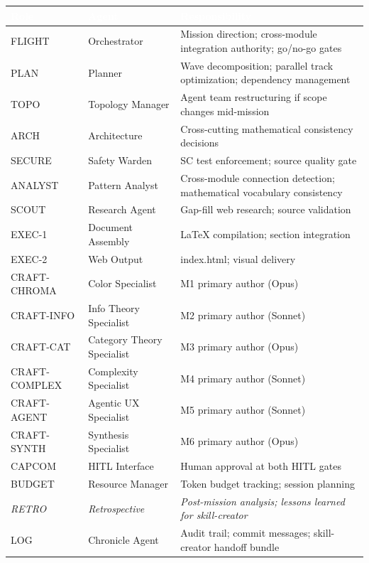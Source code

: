 \documentclass[11pt,letterpaper]{article}
\newcommand{\tableheader}[1]{\textbf{\sffamily\textcolor{white}{#1}}}
\begin{document}
\begin{center}
\begin{tabularx}{\textwidth}{L{2cm}L{3cm}X}
\toprule
{}
\tableheader{Role} & \tableheader{Agent} & \tableheader{Responsibility} \\
\midrule
FLIGHT & Orchestrator & Mission direction; cross-module integration authority; go/no-go gates \\
PLAN & Planner & Wave decomposition; parallel track optimization; dependency management \\
TOPO & Topology Manager & Agent team restructuring if scope changes mid-mission \\
ARCH & Architecture & Cross-cutting mathematical consistency decisions \\
SECURE & Safety Warden & SC test enforcement; source quality gate \\
ANALYST & Pattern Analyst & Cross-module connection detection; mathematical vocabulary consistency \\
SCOUT & Research Agent & Gap-fill web research; source validation \\
EXEC-1 & Document Assembly & LaTeX compilation; section integration \\
EXEC-2 & Web Output & index.html; visual delivery \\
CRAFT-CHROMA & Color Specialist & M1 primary author (Opus) \\
CRAFT-INFO & Info Theory Specialist & M2 primary author (Sonnet) \\
CRAFT-CAT & Category Theory Specialist & M3 primary author (Opus) \\
CRAFT-COMPLEX & Complexity Specialist & M4 primary author (Sonnet) \\
CRAFT-AGENT & Agentic UX Specialist & M5 primary author (Sonnet) \\
CRAFT-SYNTH & Synthesis Specialist & M6 primary author (Opus) \\
CAPCOM & HITL Interface & Human approval at both HITL gates \\
BUDGET & Resource Manager & Token budget tracking; session planning \\
\midrule
{}
\textit{RETRO} & \textit{Retrospective} & \textit{Post-mission analysis; lessons learned for skill-creator} \\
LOG & Chronicle Agent & Audit trail; commit messages; skill-creator handoff bundle \\
\bottomrule
\end{tabularx}
\end{center}
\end{document}
